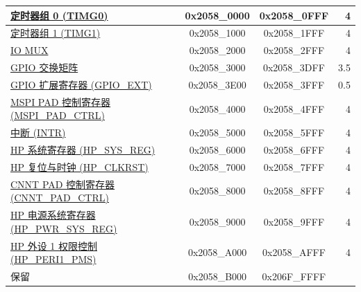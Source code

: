 \begin{ThreePartTable}
\begin{longtable}[c]{ |p{7cm}|c|c|r| }
    \hyperref[mod:timg]{定时器组 0 (TIMG0)} & 0x2058\_0000 & 0x2058\_0FFF &   4\\\hline
    \hyperref[mod:timg]{定时器组 1 (TIMG1)} & 0x2058\_1000 & 0x2058\_1FFF &   4\\\hline
    \hyperref[mod:iomuxgpio]{IO MUX}       & 0x2058\_2000 & 0x2058\_2FFF &   4\\\hline
    \hyperref[mod:iomuxgpio]{GPIO 交换矩阵} & 0x2058\_3000 & 0x2058\_3DFF & 3.5\\\hline
    \hyperref[mod:iomuxgpio]{GPIO 扩展寄存器 (GPIO\_EXT)} & 0x2058\_3E00 & 0x2058\_3FFF & 0.5\\\hline
    \hyperref[mod:spi]{MSPI PAD 控制寄存器 (MSPI\_PAD\_CTRL)} & 0x2058\_4000 & 0x2058\_4FFF &   4\\\hline
    \hyperref[mod:intmtrx]{中断 (INTR)} & 0x2058\_5000 & 0x2058\_5FFF &   4\\\hline
    \hyperref[mod:sysreg]{HP 系统寄存器 (HP\_SYS\_REG)} & 0x2058\_6000 & 0x2058\_6FFF &   4\\\hline
    \hyperref[mod:resclk]{HP 复位与时钟 (HP\_CLKRST)} & 0x2058\_7000 & 0x2058\_7FFF &   4\\\hline
    \hyperref[mod:sysreg]{CNNT PAD 控制寄存器 (CNNT\_PAD\_CTRL)}  & 0x2058\_8000 & 0x2058\_8FFF &   4\\\hline
    \hyperref[mod:sysreg]{HP 电源系统寄存器 (HP\_PWR\_SYS\_REG)} & 0x2058\_9000 & 0x2058\_9FFF &   4 \\\hline
    \hyperref[mod:permctrl]{HP 外设 1 权限控制 (HP\_PERI1\_PMS)} & 0x2058\_A000 & 0x2058\_AFFF &   4\\\hline
        \rowcolor{gray!25}  保留          & 0x2058\_B000 & 0x206F\_FFFF &    \\\hline


\end{longtable}
\end{ThreePartTable}
